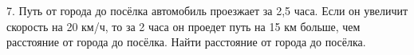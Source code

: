7. Путь от города до посёлка автомобиль проезжает за 2,5 часа. Если он увеличит скорость на 20 км/ч, то за 2 часа он проедет путь на 15 км больше, чем расстояние от города до посёлка. Найти расстояние от города до посёлка.\\
